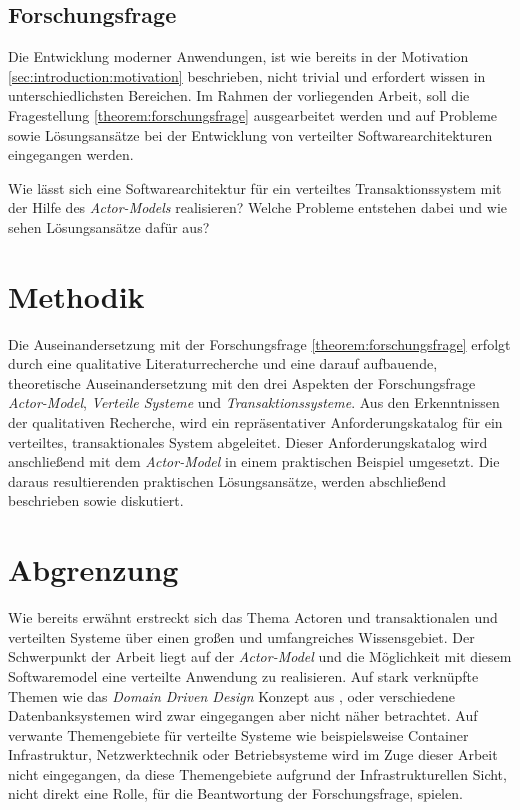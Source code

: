 \subsection{Forschungsfrage}\label{sec:introduction:forschungsfrage}
Die Entwicklung moderner Anwendungen, ist wie bereits in der Motivation \ref{sec:introduction:motivation} beschrieben, nicht trivial und erfordert wissen in unterschiedlichsten Bereichen. Im Rahmen der vorliegenden Arbeit, soll die Fragestellung \ref{theorem:forschungsfrage} ausgearbeitet werden und auf Probleme sowie Lösungsansätze bei der Entwicklung von verteilter Softwarearchitekturen eingegangen werden.
\begin{Theorem}
\label{theorem:forschungsfrage}
Wie lässt sich eine Softwarearchitektur für ein verteiltes Transaktionssystem mit der Hilfe des \textit{Actor-Models} realisieren? Welche Probleme entstehen dabei und wie sehen Lösungsansätze dafür aus?
\end{Theorem}

\section{Methodik}
Die Auseinandersetzung mit der Forschungsfrage \ref{theorem:forschungsfrage} erfolgt durch eine qualitative Literaturrecherche und eine darauf aufbauende, theoretische Auseinandersetzung mit den drei Aspekten der Forschungsfrage \textit{Actor-Model}, \textit{Verteile Systeme} und \textit{Transaktionssysteme}. Aus den Erkenntnissen der qualitativen Recherche, wird ein repräsentativer Anforderungskatalog für ein verteiltes, transaktionales System abgeleitet. Dieser Anforderungskatalog wird anschließend mit dem \textit{Actor-Model} in einem praktischen Beispiel umgesetzt. Die daraus resultierenden praktischen Lösungsansätze, werden abschließend beschrieben sowie diskutiert.
 
\section{Abgrenzung}
Wie bereits erwähnt erstreckt sich das Thema Actoren und transaktionalen und verteilten Systeme über einen großen und umfangreiches Wissensgebiet. Der Schwerpunkt der Arbeit liegt auf der \textit{Actor-Model} und die Möglichkeit mit diesem Softwaremodel eine verteilte Anwendung zu realisieren. Auf stark verknüpfte Themen wie das \textit{Domain Driven Design} Konzept aus \cite{Evans2004Domain-drivenSoftware}, oder verschiedene Datenbanksystemen wird zwar eingegangen aber nicht näher betrachtet. Auf verwante Themengebiete für verteilte Systeme wie beispielsweise Container Infrastruktur, Netzwerktechnik oder Betriebsysteme wird im Zuge dieser Arbeit nicht eingegangen, da diese Themengebiete aufgrund der Infrastrukturellen Sicht, nicht direkt eine Rolle, für die Beantwortung der Forschungsfrage, spielen. 

